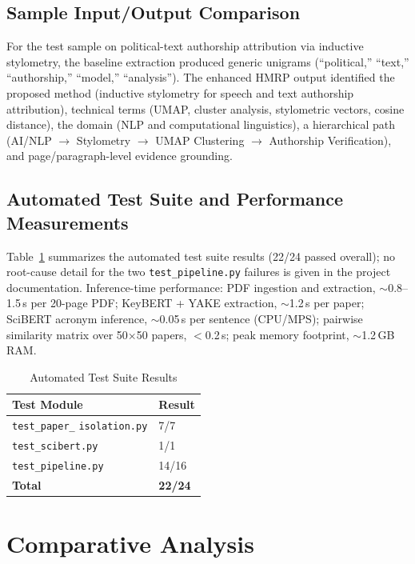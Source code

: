 \documentclass[10pt,conference]{IEEEtran}
\begin{document}
\subsection{Sample Input/Output Comparison}
For the test sample on political-text authorship attribution via inductive stylometry, the baseline extraction produced generic unigrams (``political,'' ``text,'' ``authorship,'' ``model,'' ``analysis''). The enhanced HMRP output identified the proposed method (inductive stylometry for speech and text authorship attribution), technical terms (UMAP, cluster analysis, stylometric vectors, cosine distance), the domain (NLP and computational linguistics), a hierarchical path (AI/NLP $\rightarrow$ Stylometry $\rightarrow$ UMAP Clustering $\rightarrow$ Authorship Verification), and page/paragraph-level evidence grounding.

\subsection{Automated Test Suite and Performance Measurements}
Table~\ref{tab:tests} summarizes the automated test suite results (22/24 passed overall); no root-cause detail for the two \texttt{test\_pipeline.py} failures is given in the project documentation. Inference-time performance: PDF ingestion and extraction, $\sim$0.8--1.5\,s per 20-page PDF; KeyBERT + YAKE extraction, $\sim$1.2\,s per paper; SciBERT acronym inference, $\sim$0.05\,s per sentence (CPU/MPS); pairwise similarity matrix over 50$\times$50 papers, $<$0.2\,s; peak memory footprint, $\sim$1.2\,GB RAM.

\begin{table}[t]
\caption{Automated Test Suite Results}
\label{tab:tests}
\centering
\small
\begin{tabular}{@{}p{}p{}@{}}
\toprule
\textbf{Test Module} & \textbf{Result} \\
\midrule
\texttt{\footnotesize test\_paper\_} \newline \texttt{\footnotesize isolation.py} & 7/7 \\
\texttt{\footnotesize test\_scibert.py} & 1/1 \\
\texttt{\footnotesize test\_pipeline.py} & 14/16 \\
\midrule
\textbf{Total} & \textbf{22/24} \\
\bottomrule
\end{tabular}
\end{table}

\section{Comparative Analysis}
\label{sec:comparative}
\end{document}
